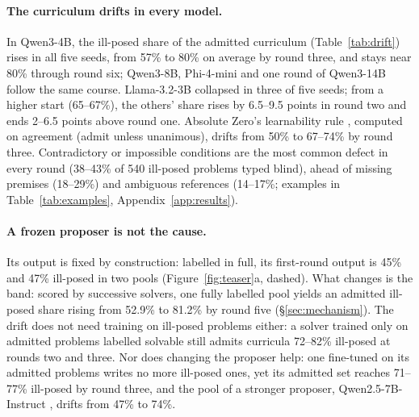 \paragraph{The curriculum drifts in every model.} In Qwen3-4B, the ill-posed share of the admitted curriculum (Table~\ref{tab:drift}) rises in all five seeds, from 57\% to 80\% on average by round three, and stays near 80\% through round six; Qwen3-8B, Phi-4-mini and one round of Qwen3-14B follow the same course. Llama-3.2-3B collapsed in three of five seeds; from a higher start (65--67\%), the others' share rises by 6.5--9.5 points in round two and ends 2--6.5 points above round one. Absolute Zero's learnability rule \citep{zhao2025absolute}, computed on agreement (admit unless unanimous), drifts from 50\% to 67--74\% by round three. Contradictory or impossible conditions are the most common defect in every round (38--43\% of 540 ill-posed problems typed blind), ahead of missing premises (18--29\%) and ambiguous references (14--17\%; examples in Table~\ref{tab:examples}, Appendix~\ref{app:results}).

\paragraph{A frozen proposer is not the cause.} Its output is fixed by construction: labelled in full, its first-round output is 45\% and 47\% ill-posed in two pools (Figure~\ref{fig:teaser}a, dashed). What changes is the band: scored by successive solvers, one fully labelled pool yields an admitted ill-posed share rising from 52.9\% to 81.2\% by round five (\S\ref{sec:mechanism}). The drift does not need training on ill-posed problems either: a solver trained only on admitted problems labelled solvable still admits curricula 72--82\% ill-posed at rounds two and three. Nor does changing the proposer help: one fine-tuned on its admitted problems writes no more ill-posed ones, yet its admitted set reaches 71--77\% ill-posed by round three, and the pool of a stronger proposer, Qwen2.5-7B-Instruct \citep{qwen2025qwen25}, drifts from 47\% to 74\%.

